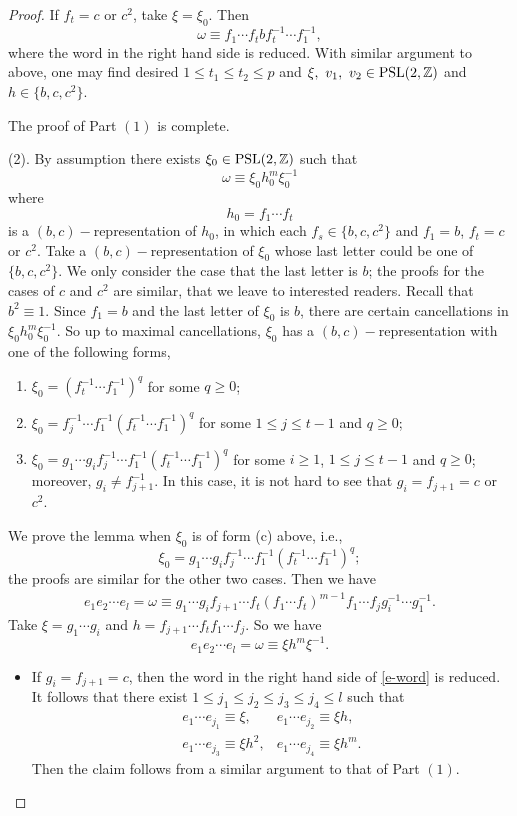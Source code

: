 \documentclass{amsart}
\theoremstyle{plain}
\theoremstyle{definition}
\theoremstyle{remark}
\begin{document}
\begin{proof}
        If $f_t=c$ or $c^2$, take $\xi=\xi_0$. Then 
        $$\omega\equiv f_1\cdots f_tbf_t^{-1}\cdots f_1^{-1},$$
        where the word in the right hand side is reduced. With similar argument to above, one may find desired $1\leq t_1\leq t_2\leq p$ and $\xi,\ v_1,\ v_2\in\textnormal{PSL}(2,\mathbb{Z})$ and $h\in\{b,c,c^2\}$.

        The proof of Part $(1)$ is complete.
        
        (2). By assumption there exists $\xi_0\in\textnormal{PSL}(2,\mathbb{Z})$ such that $$\omega\equiv \xi_0 h_0^m\xi_0^{-1}$$ where
        $$h_0=f_1\cdots f_t$$
        is a $(b,c)-$representation of $h_0$, in which each $f_s\in\{b,c,c^{2}\}$ and $f_1=b$, $f_t=c$ or $c^{2}$. Take a $(b,c)-$representation of $\xi_0$ whose last letter could be one of $\{b,c,c^2\}$. We only consider the case that the last letter is $b$; the proofs for the cases of $c$ and $c^2$ are similar, that we leave to interested readers. Recall that $b^2 \equiv 1$. Since $f_1=b$ and the last letter of $\xi_0$ is $b$, there are certain cancellations in $\xi_0 h_0^m\xi_0^{-1}.$ So up to maximal cancellations, $\xi_0$ has a $(b,c)-$representation with one of the following forms,
        \begin{enumerate}
            \item $\xi_0=\left(f_t^{-1}\cdots f_1^{-1}\right)^q$ for some $q\geq 0$;
            \item $\xi_0=f_j^{-1}\cdots f_1^{-1}\left(f_t^{-1}\cdots f_1^{-1}\right)^q$ for some $1\leq j\leq t-1$ and $q\geq 0$;
            \item $\xi_0=g_1\cdots g_if_j^{-1}\cdots f_1^{-1}\left(f_t^{-1}\cdots f_1^{-1}\right)^q$ for some $i\geq 1$, $1\leq j\leq t-1$ and $q\geq 0$; moreover, $g_i \neq f_{j+1}^{-1}$. In this case, it is not hard to see that $g_i=f_{j+1}=c$ or $c^2$.
        \end{enumerate}
         We prove the lemma when $\xi_0$ is of form (c) above, i.e.,  
         $$\xi_0=g_1\cdots g_if_j^{-1}\cdots f_1^{-1}\left(f_t^{-1}\cdots f_1^{-1}\right)^q;$$
         the proofs are similar for the other two cases. Then we have
        \begin{align}\label{e-word}
        e_1e_2\cdots e_l=\omega \equiv g_1\cdots g_i f_{j+1}\cdots f_t\left(f_1\cdots f_t\right)^{m-1}f_1\cdots f_j g_i^{-1}\cdots g_1^{-1}.
        \end{align}
        Take $\xi=g_1\cdots g_i$ and $h=f_{j+1}\cdots f_t f_1\cdots f_j$. So we have 
        \[e_1e_2\cdots e_l=\omega \equiv \xi h^m \xi^{-1}.\]
        \begin{itemize}
        \item If $g_i=f_{j+1}=c$, then the word in the right hand side of \eqref{e-word} is reduced. It follows that there exist $1\leq j_1\leq j_2\leq j_3\leq j_4\leq l$ such that
        $$\begin{matrix}e_1\cdots e_{j_1}\equiv \xi, & e_1\cdots e_{j_2}\equiv \xi h,
        \\
        e_1\cdots e_{j_3}\equiv \xi h^2, & e_1\cdots e_{j_4}\equiv \xi h^m.\end{matrix}$$
        Then the claim follows from a similar argument to that of Part $(1)$.


\end{itemize}
\end{proof}
\end{document}
